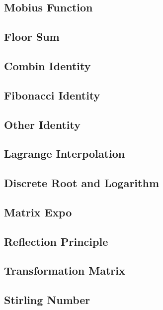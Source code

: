 \subsection{Mobius Function}

\subsection{Floor Sum}

\subsection{Combin Identity}

\subsection{Fibonacci Identity}

\subsection{Other Identity}

\subsection{Lagrange Interpolation}

\subsection{Discrete Root and Logarithm}

\subsection{Matrix Expo}

\subsection{Reflection Principle}

\subsection{Transformation Matrix}

\subsection{Stirling Number}

